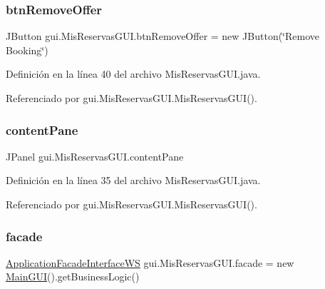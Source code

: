 \subsubsection{\texorpdfstring{btnRemoveOffer}{btnRemoveOffer}}
{\footnotesize\ttfamily J\+Button gui.\+Mis\+Reservas\+G\+U\+I.\+btn\+Remove\+Offer = new J\+Button(\char`\"{}Remove Booking\char`\"{})\hspace{0.3cm}{\ttfamily [private]}}



Definición en la línea 40 del archivo Mis\+Reservas\+G\+U\+I.\+java.



Referenciado por gui.\+Mis\+Reservas\+G\+U\+I.\+Mis\+Reservas\+G\+U\+I().

\mbox{\label{classgui_1_1_mis_reservas_g_u_i_a0e75257d07910111e880685dd6453a9e}} 
\subsubsection{\texorpdfstring{contentPane}{contentPane}}
{\footnotesize\ttfamily J\+Panel gui.\+Mis\+Reservas\+G\+U\+I.\+content\+Pane\hspace{0.3cm}{\ttfamily [private]}}



Definición en la línea 35 del archivo Mis\+Reservas\+G\+U\+I.\+java.



Referenciado por gui.\+Mis\+Reservas\+G\+U\+I.\+Mis\+Reservas\+G\+U\+I().

\mbox{\label{classgui_1_1_mis_reservas_g_u_i_a29c70d8f7ee208b3f955023be16bbfec}} 
\subsubsection{\texorpdfstring{facade}{facade}}
{\footnotesize\ttfamily \mbox{\hyperlink{interfacebusiness_logic_1_1_application_facade_interface_w_s}{Application\+Facade\+Interface\+WS}} gui.\+Mis\+Reservas\+G\+U\+I.\+facade = new \mbox{\hyperlink{classgui_1_1_main_g_u_i}{Main\+G\+UI}}().get\+Business\+Logic()\hspace{0.3cm}{\ttfamily [private]}}



